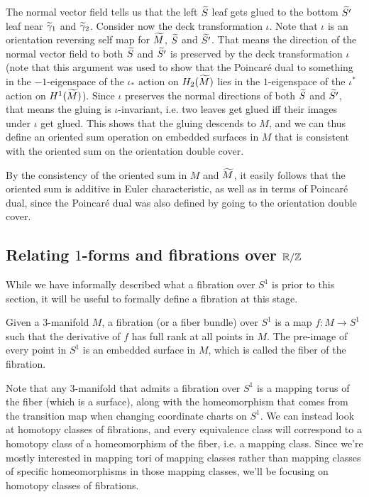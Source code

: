 The normal vector field tells us that the left $\widetilde{S}$ leaf gets glued to the bottom $\widetilde{S'}$ leaf near
$\widetilde{\gamma}_1$ and $\widetilde{\gamma}_2$. Consider now the deck transformation $\iota$. Note that $\iota$ is an
orientation reversing self map for $\widetilde{M}$, $\widetilde{S}$ and $\widetilde{S'}$. That means the direction of the normal
vector field to both $\widetilde{S}$ and $\widetilde{S'}$ is preserved by the deck transformation $\iota$ (note that this
argument was used to show that the Poincar\'e dual to something in the $-1$-eigenspace of the $\iota_{\ast}$
action on $H_2(\widetilde{M})$ lies in the $1$-eigenspace of the $\iota^{\ast}$ action on $H^1(\widetilde{M})$). Since $\iota$
preserves the normal directions of both $\widetilde{S}$ and $\widetilde{S'}$, that means the gluing is $\iota$-invariant, i.e.
two leaves get glued iff their images under $\iota$ get glued. This shows that the gluing descends to $M$, and
we can thus define an oriented sum operation on embedded surfaces in $M$ that is consistent with the oriented
sum on the orientation double cover.

By the consistency of the oriented sum in $M$ and $\widetilde{M}$, it easily follows that the oriented sum is additive
in Euler characteristic, as well as in terms of Poincar\'e dual, since the Poincar\'e dual was also defined
by going to the orientation double cover.

\subsection{Relating $1$-forms and fibrations over $\mathbb{R}/\mathbb{Z}$}
\label{sec:relating-1-forms}
While we have informally described what a fibration over $S^1$ is prior to this section, it will be
useful to formally define a fibration at this stage.
\begin{defn}
  Given a $3$-manifold $M$, a fibration (or a fiber bundle) over $S^1$ is a map $f: M \to S^1$ such
  that the derivative of $f$ has full rank at all points in $M$. The pre-image of every point in
  $S^1$ is an embedded surface in $M$, which is called the fiber of the fibration.
\end{defn}
Note that any $3$-manifold that admits a fibration over $S^1$ is a mapping torus of the fiber (which is a
surface), along with the homeomorphism that comes from the transition map when changing coordinate charts on
$S^1$. We can instead look at homotopy classes of fibrations, and every equivalence class will correspond to a
homotopy class of a homeomorphism of the fiber, i.e. a mapping class. Since we're mostly interested in mapping
tori of mapping classes rather than mapping classes of specific homeomorphisms in those mapping classes, we'll
be focusing on homotopy classes of fibrations.

